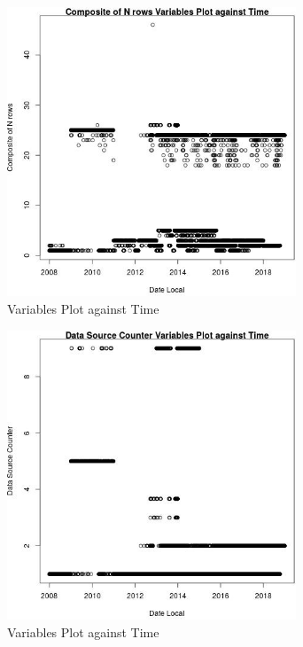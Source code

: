 \begin{figure} 
\centering  
\includegraphics[width=0.77\textwidth]{Code_Outputs/Report_PM25_Step4_part_e_de_duplicated_aves_ML_input_Composite_of_N_rowsvDate_Local.jpg} 
\caption{\label{fig:Report_PM25_Step4_part_e_de_duplicated_aves_ML_inputComposite_of_N_rowsvDate_Local}Variables Plot against Time} 
\end{figure} 
 

\begin{figure} 
\centering  
\includegraphics[width=0.77\textwidth]{Code_Outputs/Report_PM25_Step4_part_e_de_duplicated_aves_ML_input_Data_Source_CountervDate_Local.jpg} 
\caption{\label{fig:Report_PM25_Step4_part_e_de_duplicated_aves_ML_inputData_Source_CountervDate_Local}Variables Plot against Time} 
\end{figure} 
 


